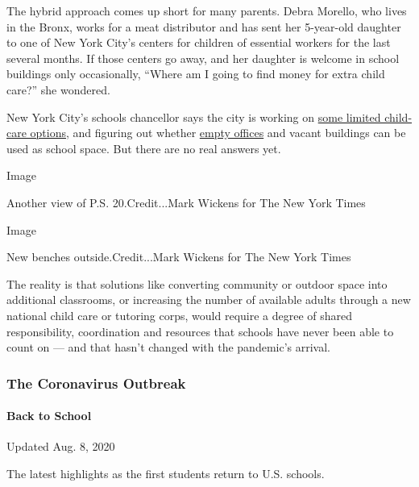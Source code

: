 The hybrid approach comes up short for many parents. Debra Morello, who
lives in the Bronx, works for a meat distributor and has sent her
5-year-old daughter to one of New York City's centers for children of
essential workers for the last several months. If those centers go away,
and her daughter is welcome in school buildings only occasionally,
``Where am I going to find money for extra child care?'' she wondered.

New York City's schools chancellor says the city is working on
\href{https://ny.chalkbeat.org/2020/7/16/21327364/nyc-vows-to-open-child-care-part-time-school}{some
limited child-care options}, and figuring out whether
\href{https://www.ny1.com/nyc/all-boroughs/education/2020/07/16/why-schools-chancellor-says-split-school-schedule-is-a-no-go-for-fall}{empty
offices} and vacant buildings can be used as school space. But there are
no real answers yet.

Image

Another view of P.S. 20.Credit...Mark Wickens for The New York Times

Image

New benches outside.Credit...Mark Wickens for The New York Times

The reality is that solutions like converting community or outdoor space
into additional classrooms, or increasing the number of available adults
through a new national child care or tutoring corps, would require a
degree of shared responsibility, coordination and resources that schools
have never been able to count on --- and that hasn't changed with the
pandemic's arrival.

\hypertarget{the-coronavirus-outbreak}{%
\subsubsection{The Coronavirus
Outbreak}\label{the-coronavirus-outbreak}}

\hypertarget{back-to-school}{%
\paragraph{Back to School}\label{back-to-school}}

Updated Aug. 8, 2020

The latest highlights as the first students return to U.S. schools.

